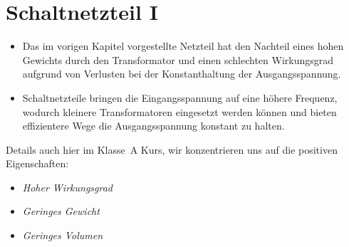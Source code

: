 
\section{Schaltnetzteil I}
\label{section:schaltnetzteil_1}
\begin{frame}%
\begin{itemize}
  \item Das im vorigen Kapitel vorgestellte Netzteil hat den Nachteil eines hohen Gewichts durch den Transformator und einen schlechten Wirkungsgrad aufgrund von Verlusten bei der Konstanthaltung der Ausgangsspannung.
  \item Schaltnetzteile bringen die Eingangsspannung auf eine höhere Frequenz, wodurch kleinere Transformatoren eingesetzt werden können und bieten effizientere Wege die Ausgangsspannung konstant zu halten.
  \end{itemize}
\end{frame}

\begin{frame}Details auch hier im Klasse~A Kurs, wir konzentrieren uns auf die positiven Eigenschaften:

\begin{itemize}
  \item \emph{Hoher Wirkungsgrad}
  \item \emph{Geringes Gewicht}
  \item \emph{Geringes Volumen}
  \end{itemize}
\end{frame}

\begin{frame}
\end{frame}

